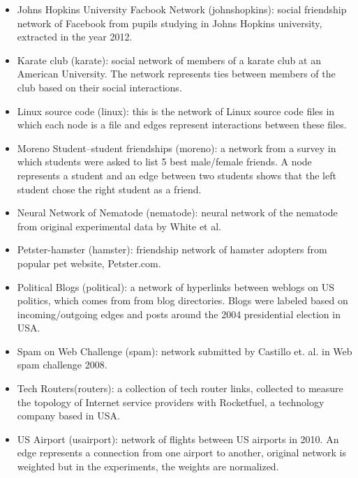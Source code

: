 \begin{itemize}
			\item Johns Hopkins University Facbook Network (johnshopkins)\cite{ryan2015}: social friendship network of Facebook from pupils studying in Johns Hopkins university, extracted in the year 2012.
			
			\item Karate club (karate)\cite{zachary1977}: social network of members of a karate club at an American University. The network represents ties between members of the club based on their social interactions.
			
			\item Linux source code (linux)\cite{linux}: this is the network of Linux source code files in which each node is a file and edges represent interactions between these files.
			
			\item Moreno Student–student friendships (moreno)\cite{moody2001}: a network from a survey in which students were asked to list 5 best male/female friends. A node represents a student and an edge between two students shows that the left student chose the right student as a friend.
			
			\item Neural Network of Nematode (nematode)\cite{white1986}: neural network of the nematode from original experimental data by White et al.
			
			\item Petster-hamster (hamster)\cite{hamster}: friendship network of hamster adopters from popular pet website, Petster.com.
	
			\item Political Blogs (political)\cite{adamic2005}: a network of hyperlinks between weblogs on US politics, which comes from from blog directories. Blogs were labeled based on incoming/outgoing edges and posts around the 2004 presidential election in USA.
			
			\item Spam on Web Challenge (spam)\cite{castillo2008}: network submitted by Castillo et. al. in Web spam challenge 2008.
			
			\item Tech Routers(routers)\cite{spring2002}: a collection of tech router links, collected to measure the topology of Internet service providers with Rocketfuel, a technology company based in USA.
	
			\item US Airport (usairport)\cite{opsahl-usairport}: network of flights between US airports in 2010. An edge represents a connection from one airport to another, original network is weighted but in the experiments, the weights are normalized.
			

\end{itemize}
